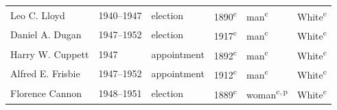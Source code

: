 \begin{longtable}{Q}
Leo C. Lloyd & 1940--1947 & election & 1890\textsuperscript{c} & man\textsuperscript{c} & White\textsuperscript{c} \\
Daniel A. Dugan & 1947--1952 & election & 1917\textsuperscript{c} & man\textsuperscript{c} & White\textsuperscript{c} \\
Harry W. Cuppett & 1947 & appointment & 1892\textsuperscript{c} & man\textsuperscript{c} & White\textsuperscript{c} \\
Alfred E. Frisbie & 1947--1952 & appointment & 1912\textsuperscript{c} & man\textsuperscript{c} & White\textsuperscript{c} \\*
Florence Cannon & 1948--1951 & election & 1889\textsuperscript{c} & woman\textsuperscript{c,\,p} & White\textsuperscript{c} \\
\end{longtable}\par
\endgroup
\clearpage\begingroup
{}
\medskip
\footnotesize\setlength{\tabcolsep}{8pt}\setlength{\LTpre}{0pt}\setlength{\LTpost}{0pt}
\settowidth{\rcA}{Matthew D. "Matt" de Ferranti}
\settowidth{\rcB}{1870--1873}
\settowidth{\rcC}{special election}
\setlength{\rcslack}{\dimexpr(\textwidth-0.5pt-\rcA-\rcB-\rcC-\rcD-\rcE-\rcF-10\tabcolsep)/5\relax}
\addtolength{\rcA}{\rcslack}
\addtolength{\rcB}{\rcslack}
\addtolength{\rcC}{\rcslack}
\addtolength{\rcD}{\rcslack}
\addtolength{\rcE}{\rcslack}
